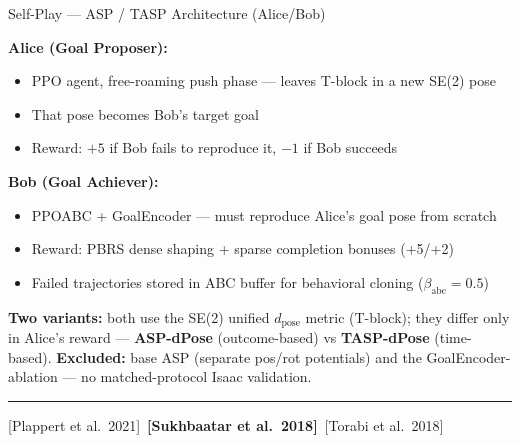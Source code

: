 \documentclass[aspectratio=169,xcolor=dvipsnames,t]{beamer}
\newcommand{\litfooter}[1]{%
  \vspace{2pt}%
  \hrule%
  \vspace{2pt}%
  {\tiny\color{LightDarkGrey} #1}%
}
\begin{document}
\begin{frame}[t]{Self-Play — ASP / TASP Architecture (Alice/Bob)}
  \vspace{-6pt}
  {\small
  \textbf{Alice (Goal Proposer):}
  \begin{itemize}
    \item PPO agent, free-roaming push phase — leaves T-block in a new SE(2) pose
    \item That pose becomes Bob's target goal
    \item Reward: $+5$ if Bob fails to reproduce it, $-1$ if Bob succeeds
  \end{itemize}

  \vspace{-2pt}
  \textbf{Bob (Goal Achiever):}
  \begin{itemize}
    \item PPOABC + GoalEncoder — must reproduce Alice's goal pose from scratch
    \item Reward: PBRS dense shaping + sparse completion bonuses (+5/+2)
    \item Failed trajectories stored in ABC buffer for behavioral cloning ($\beta_{\text{abc}}{=}0.5$)
  \end{itemize}

  \vspace{-2pt}
  \textbf{Two variants:} both use the SE(2) unified $d_{\text{pose}}$ metric (T-block); they differ only in Alice's reward — \textbf{ASP-dPose} (outcome-based) vs \textbf{TASP-dPose} (time-based).
  \textbf{Excluded:} base ASP (separate pos/rot potentials) and the GoalEncoder-ablation — no matched-protocol Isaac validation.
  }

  \vfill\litfooter{[Plappert et al.\ 2021]~\textbf{[Sukhbaatar et al.\ 2018]}~[Torabi et al.\ 2018]}
\end{frame}

\end{document}
